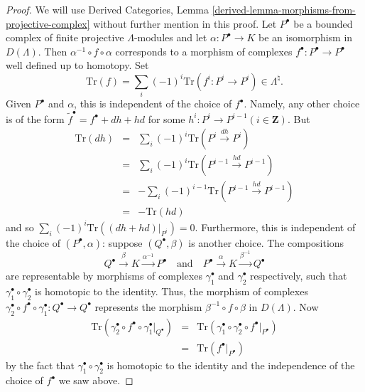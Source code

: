 \documentclass{stacks-project}
\theoremstyle{plain}
\theoremstyle{definition}
\theoremstyle{remark}
\numberwithin{equation}{subsection}
\begin{document}
\begin{proof}
We will use Derived Categories, Lemma
\ref{derived-lemma-morphisms-from-projective-complex}
without further mention in this proof.
Let $P^\bullet$ be a bounded complex of finite projective $\Lambda$-modules
and let $\alpha : P^\bullet \to K$ be an isomorphism in $D(\Lambda)$. Then
$\alpha^{-1}\circ f\circ \alpha$ corresponds to a morphism of complexes
$f^\bullet : P^\bullet \to P^\bullet$ well defined up to homotopy.
Set
$$
\text{Tr}(f) = \sum_i (-1)^i \text{Tr}(f^i : P^i \to P^i) \in \Lambda^\natural.
$$
Given $P^\bullet$ and $\alpha$, this is independent of the choice of
$f^\bullet$. Namely, any other choice is of the form
$\tilde{f}^\bullet = f^\bullet + dh +hd$ for some
$h^i : P^i \to P^{i-1}(i\in \mathbf{Z})$. But
\begin{eqnarray*}
\text{Tr}(dh) & = & \sum_i (-1)^i \text{Tr}(P^i\xrightarrow{dh} P^i) \\
& = & \sum_i (-1)^i \text{Tr}(P^{i-1}\xrightarrow{hd} P^{i-1}) \\
& = & -\sum_i (-1)^{i-1}\text{Tr}(P^{i-1}\xrightarrow{hd} P^{i-1}) \\
& = & - \text{Tr}(hd)
\end{eqnarray*}
and so $\sum_i (-1)^i \text{Tr} ((dh+hd)|_{P^i})=0$.
Furthermore, this is independent of the choice of $(P^\bullet , \alpha)$:
suppose $(Q^\bullet, \beta)$ is another choice. The compositions
$$
Q^\bullet \xrightarrow{\beta} K \xrightarrow{\alpha^{-1}} P^\bullet
\quad\text{and}\quad
P^\bullet \xrightarrow{\alpha} K \xrightarrow{\beta^{-1}} Q^\bullet
$$
are representable by morphisms of complexes $\gamma_1^\bullet$ and
$\gamma_2^\bullet$ respectively, such that $\gamma_1^\bullet \circ
\gamma_2^\bullet$ is homotopic to the identity. Thus, the morphism of complexes
$\gamma_2^\bullet\circ f^\bullet\circ \gamma_1^\bullet : Q^\bullet\to Q^\bullet$
represents the morphism $\beta^{-1}\circ f\circ\beta$ in $D(\Lambda)$. Now
\begin{eqnarray*}
\text{Tr}(\gamma_2^\bullet\circ f^\bullet\circ\gamma_1^\bullet|_{Q^\bullet}) &
= & \text{Tr}(\gamma_1^\bullet \circ\gamma_2^\bullet \circ
f^\bullet|_{P^\bullet})\\
& = & \text{Tr}(f^\bullet|_{P^\bullet})
\end{eqnarray*}
by the fact that $\gamma_1^\bullet \circ \gamma_2^\bullet$ is homotopic to the
identity and the independence of the choice of $f^\bullet$ we saw above.
\end{proof}
\end{document}
